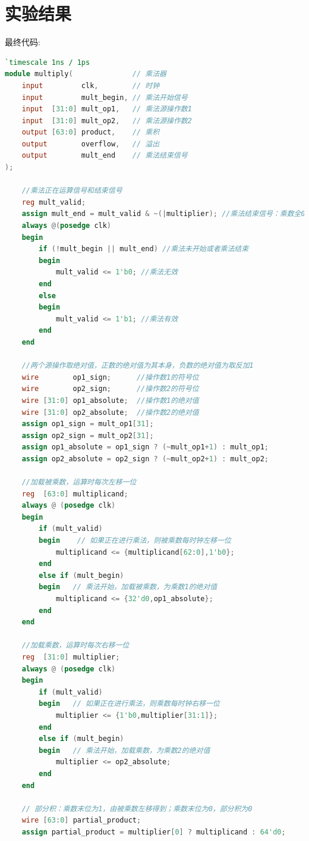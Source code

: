 \documentclass[AutoFakeBold]{LZUThesis}
\begin{document}
\chapter{实验结果}
最终代码:
\begin{lstlisting}[language=Verilog]
`timescale 1ns / 1ps
module multiply(              // 乘法器
    input         clk,        // 时钟
    input         mult_begin, // 乘法开始信号
    input  [31:0] mult_op1,   // 乘法源操作数1
    input  [31:0] mult_op2,   // 乘法源操作数2
    output [63:0] product,    // 乘积
    output        overflow,   // 溢出
    output        mult_end    // 乘法结束信号
);

    //乘法正在运算信号和结束信号
    reg mult_valid;
    assign mult_end = mult_valid & ~(|multiplier); //乘法结束信号：乘数全0
    always @(posedge clk)
    begin
        if (!mult_begin || mult_end) //乘法未开始或者乘法结束
        begin
            mult_valid <= 1'b0; //乘法无效
        end
        else
        begin
            mult_valid <= 1'b1; //乘法有效
        end
    end

    //两个源操作取绝对值，正数的绝对值为其本身，负数的绝对值为取反加1
    wire        op1_sign;      //操作数1的符号位
    wire        op2_sign;      //操作数2的符号位
    wire [31:0] op1_absolute;  //操作数1的绝对值
    wire [31:0] op2_absolute;  //操作数2的绝对值
    assign op1_sign = mult_op1[31];
    assign op2_sign = mult_op2[31];
    assign op1_absolute = op1_sign ? (~mult_op1+1) : mult_op1;
    assign op2_absolute = op2_sign ? (~mult_op2+1) : mult_op2;

    //加载被乘数，运算时每次左移一位
    reg  [63:0] multiplicand;
    always @ (posedge clk)
    begin
        if (mult_valid)
        begin    // 如果正在进行乘法，则被乘数每时钟左移一位
            multiplicand <= {multiplicand[62:0],1'b0};
        end
        else if (mult_begin) 
        begin   // 乘法开始，加载被乘数，为乘数1的绝对值
            multiplicand <= {32'd0,op1_absolute};
        end
    end

    //加载乘数，运算时每次右移一位
    reg  [31:0] multiplier;
    always @ (posedge clk)
    begin
        if (mult_valid)
        begin   // 如果正在进行乘法，则乘数每时钟右移一位
            multiplier <= {1'b0,multiplier[31:1]}; 
        end
        else if (mult_begin)
        begin   // 乘法开始，加载乘数，为乘数2的绝对值
            multiplier <= op2_absolute; 
        end
    end
    
    // 部分积：乘数末位为1，由被乘数左移得到；乘数末位为0，部分积为0
    wire [63:0] partial_product;
    assign partial_product = multiplier[0] ? multiplicand : 64'd0;
    

\end{lstlisting}
\end{document}
